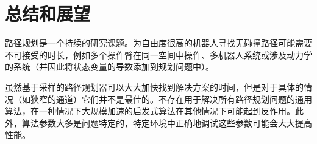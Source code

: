 
\section{总结和展望}
路径规划是一个持续的研究课题。为自由度很高的机器人寻找无碰撞路径可能需要不可接受的时长，例如多个操作臂在同一空间中操作、多机器人系统或涉及动力学的系统（并因此将状态变量的导数添加到规划问题中）。


虽然基于采样的路径规划器可以大大加快找到解决方案的时间，但是对于具体的情况（如狭窄的通道）它们并不是最佳的。不存在用于解决所有路径规划问题的通用算法，在一种情况下大规模加速的启发式算法在其他情况下可能起到反作用。此外，算法参数大多是问题特定的，特定环境中正确地调试这些参数可能会大大提高性能。


